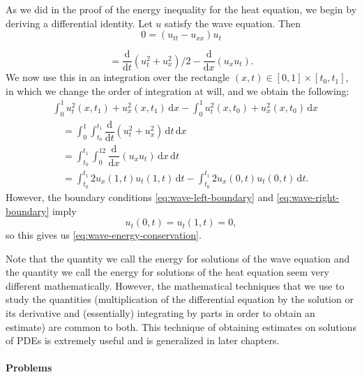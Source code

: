 \begin{Proof}
As we did in the proof of the energy inequality for the heat equation, we begin by deriving a differential identity. Let $u$ satisfy the wave equation. Then
\begin{equation}\label{eq:wave-equation-tested-by-velocity}
0=(u_{tt}-u_{xx})u_t
\end{equation}

\begin{equation}\label{eq:wave-local-energy-identity}
{}=\dfrac{\mathrm{d}}{\mathrm{d}t}(u_t^2+u_x^2)/2-\dfrac{\mathrm{d}}{\mathrm{d}x}(u_xu_t).
\end{equation}
We now use this in an integration over the rectangle $(x,t)\in[0,1]\times[t_0,t_1]$, in which we change the order of integration at will, and we obtain the following:
\[
\begin{aligned}
&\int_0^1u_t^2(x,t_1)+u_x^2(x,t_1)\,\mathrm{d}x
-\int_0^1u_t^2(x,t_0)+u_x^2(x,t_0)\,\mathrm{d}x\\
&\quad=\int_0^1\int_{t_0}^{t_1}\dfrac{\mathrm{d}}{\mathrm{d}t}(u_t^2+u_x^2)\,\mathrm{d}t\,\mathrm{d}x\\
&\quad=\int_{t_0}^{t_1}\int_0^12\dfrac{\mathrm{d}}{\mathrm{d}x}(u_xu_t)\,\mathrm{d}x\,\mathrm{d}t\\
&\quad=\int_{t_0}^{t_1}2u_x(1,t)u_t(1,t)\,\mathrm{d}t-\int_{t_0}^{t_1}2u_x(0,t)u_t(0,t)\,\mathrm{d}t.
\end{aligned}
\]
However, the boundary conditions \eqref{eq:wave-left-boundary} and \eqref{eq:wave-right-boundary} imply
\begin{equation}\label{eq:wave-boundary-time-derivatives}
u_t(0,t)=u_t(1,t)=0,
\end{equation}
so this gives us \eqref{eq:wave-energy-conservation}.
\end{Proof}

Note that the quantity we call the energy for solutions of the wave equation and the quantity we call the energy for solutions of the heat equation seem very different mathematically. However, the mathematical techniques that we use to study the quantities (multiplication of the differential equation by the solution or its derivative and (essentially) integrating by parts in order to obtain an estimate) are common to both. This technique of obtaining estimates on solutions of PDEs is extremely useful and is generalized in later chapters.

\paragraph*{Problems}

